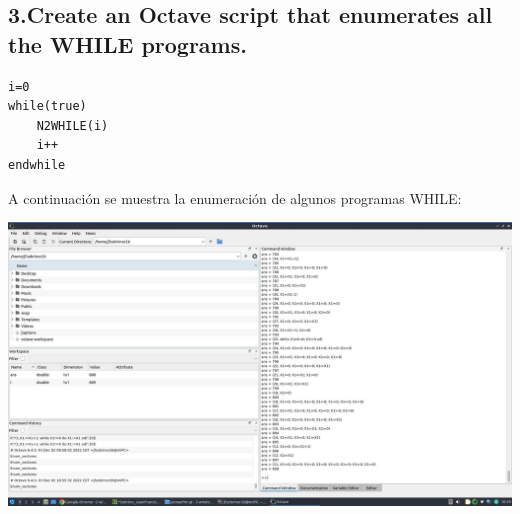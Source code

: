 \documentclass[20pt,oneside]{extbook}
\begin{document}
\subsection*{
3.Create an Octave script that enumerates all the WHILE programs.
}
\begin{verbatim}
i=0
while(true)
    N2WHILE(i)
    i++
endwhile
\end{verbatim}

A continuación se muestra la enumeración de algunos programas WHILE:

\includegraphics[scale=0.5]{Enum_WHILE-programs}
\end{document}
